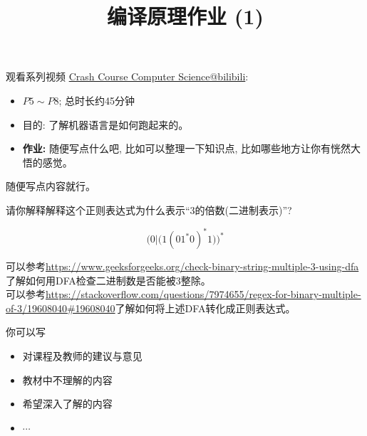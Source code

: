 \documentclass[a4paper, justified]{tufte-handout}
\title{编译原理作业 (1)}
\date{\zhtoday}
\begin{document}
	\maketitle
	\noplagiarism %
	\begin{abstract}
	\end{abstract}
	\beginrequired
	\begin{problem}[计算机系统基础]
		观看系列视频 \href{https://www.bilibili.com/video/BV1EW411u7th?}{Crash Course Computer Science@bilibili}:
		\begin{itemize}
			\item $P5 \sim P8$; 总时长约45分钟
			\item 目的: 了解机器语言是如何跑起来的。
			\item {\bf 作业:} 随便写点什么吧, 比如可以整理一下知识点, 比如哪些地方让你有恍然大悟的感觉。
		\end{itemize}
	\end{problem}
	
	\begin{solution}
		随便写点内容就行。
	\end{solution}
	
	\begin{problem}[正则表达式]
		请你解释解释这个正则表达式为什么表示``3的倍数(二进制表示)''?
		
		\[
		\Big(0|\big(1(01^{\ast}0)^{\ast}1\big)\Big)^{\ast}
		\]
		
		\begin{center}
		\end{center}
	\end{problem}
	\begin{solution}
		可以参考\url{https://www.geeksforgeeks.org/check-binary-string-multiple-3-using-dfa}了解如何用DFA检查二进制数是否能被3整除。 \\
		可以参考\url{https://stackoverflow.com/questions/7974655/regex-for-binary-multiple-of-3/19608040#19608040}了解如何将上述DFA转化成正则表达式。
	\end{solution}
	
	
	
	\beginfb
	
	你可以写
	\begin{itemize}
		\item 对课程及教师的建议与意见
		\item 教材中不理解的内容
		\item 希望深入了解的内容
		\item $\cdots$
	\end{itemize}
\end{document}
